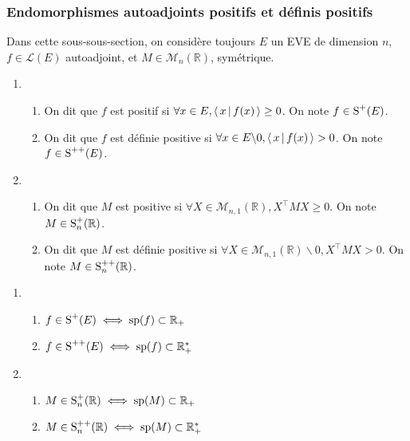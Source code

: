     \subsubsection{Endomorphismes autoadjoints positifs et définis positifs}

    Dans cette sous-sous-section, on considère toujours $E$ un EVE de dimension $n$, $f \in \mathcal{L}(E)$ autoadjoint, et $M \in \mathcal{M}_n(\mathbb{R})$, symétrique.

    \begin{defi}{}{}
        \begin{enumerate}
            \item \begin{enumerate}
            \item On dit que $f$ est positif si $\forall x \in E, \spr{x}{f(x)} \geq 0$. On note $f \in \S^+(E)$.
            \item On dit que $f$ est définie positive si $\forall x \in E \backslash {0}, \spr{x}{f(x)} > 0$. On note $f \in \S^{++}(E)$.
        \end{enumerate} 
            \item \begin{enumerate}
            \item On dit que $M$ est positive si $\forall X \in \mathcal{M}_{n,1}(\mathbb{R}), X^{\top} M X \geq 0$. On note $M \in \S_n^{+}(\mathbb{R})$.
            \item On dit que $M$ est définie positive si $\forall X \in \mathcal{M}_{n,1}(\mathbb{R}) \backslash {0}, X^{\top} M X > 0$. On note $M \in \S_n^{++}(\mathbb{R})$.
        \end{enumerate}
        \end{enumerate}
    \end{defi}

    \begin{prop}{}{}
        \begin{enumerate}
            \item \begin{enumerate}
                \item $f \in \S^+(E) \iff \sp(f) \subset \mathbb{R}_+$
                \item $f \in \S^{++}(E) \iff \sp(f) \subset \mathbb{R}_+^*$
            \end{enumerate}
            \item \begin{enumerate}
                \item $M \in \S_n^+(\mathbb{R}) \iff \sp(M) \subset \mathbb{R}_+$
                \item $M \in \S_n^{++}(\mathbb{R}) \iff \sp(M) \subset \mathbb{R}_+^*$
            \end{enumerate}
        \end{enumerate}
    \end{prop}

